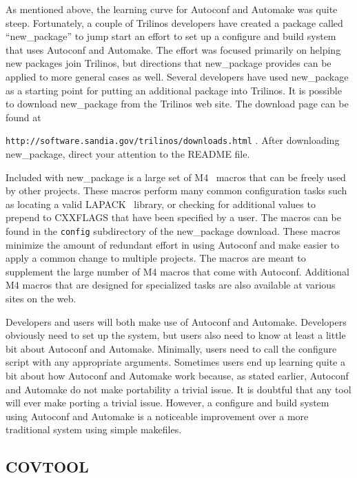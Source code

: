\documentclass[12pt,relax]{article}
\newcommand{\InlineDirectory}[1]{
  {\hspace{0.01 in}} {\tt #1} {\hspace{0.01 in}}}
\begin{document}
As mentioned above, the learning curve for Autoconf and Automake was quite 
steep.  Fortunately, a couple of Trilinos developers have created a package 
called ``new\_package'' to jump start an effort to set up a configure and 
build system that uses Autoconf and Automake.  The effort was focused 
primarily on helping new packages join Trilinos, but directions that 
new\_package provides can be applied to more general cases as well.  Several
developers have used new\_package as a starting point for putting an additional
package into Trilinos.  It is possible to download new\_package from the 
Trilinos web site.  The download page can be found at \newline 
\InlineDirectory{http://software.sandia.gov/trilinos/downloads.html}.  After
downloading new\_package, direct your attention to the README file.

Included with new\_package is a large set of M4~\cite{M4} macros that can 
be freely used by other projects.  These macros perform many common 
configuration tasks such as locating a valid LAPACK~\cite{lapack} library, 
or checking for additional values to prepend to CXXFLAGS that have been 
specified by a user.  The macros can be found in the \InlineDirectory{config}
subdirectory of the new\_package download.  These macros minimize the amount of
redundant effort in using Autoconf and make easier to apply a common change to 
multiple projects.  The macros are meant to supplement the large number of 
M4 macros that come with Autoconf.  Additional M4 macros that are designed for 
specialized tasks are also available at various sites on the web.

Developers and users will both make use of Autoconf and Automake.  Developers 
obviously need to set up the system, but users also need to know at least a 
little bit about Autoconf and Automake.  Minimally, users need to call the 
configure script with any appropriate arguments.  Sometimes users end up 
learning quite a bit about how Autoconf and Automake work because, as stated 
earlier, Autoconf and Automake do not make portability a trivial issue.  It is 
doubtful that any tool will ever make porting a trivial issue.  However, a 
configure and build system using Autoconf and Automake is a 
noticeable improvement over a more traditional system using simple makefiles.

\subsection{COVTOOL}
\end{document}
